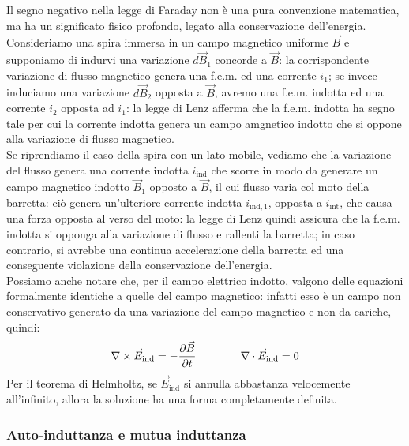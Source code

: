 \documentclass[]{article}
\begin{document}
Il segno negativo nella legge di Faraday non è una pura convenzione matematica, ma ha un significato fisico profondo, legato alla conservazione dell'energia. \\ 
%
Consideriamo una spira immersa in un campo magnetico uniforme $ \vec{B} $ e supponiamo di indurvi una variazione $ d\vec{B}_1 $ concorde a $ \vec{B} $: la corrispondente variazione di flusso magnetico genera una f.e.m. ed una corrente $ i_1 $; se invece induciamo una variazione $ d\vec{B}_2 $ opposta a $ \vec{B} $, avremo una f.e.m. indotta ed una corrente $ i_2 $ opposta ad $ i_1 $: la legge di Lenz afferma che la f.e.m. indotta ha segno tale per cui la corrente indotta genera un campo amgnetico indotto che si oppone alla variazione di flusso magnetico. \\ 
%
Se riprendiamo il caso della spira con un lato mobile, vediamo che la variazione del flusso genera una corrente indotta $ i_{\text{ind}} $ che scorre in modo da generare un campo magnetico indotto $ \vec{B}_1 $ opposto a $ \vec{B} $, il cui flusso varia col moto della barretta: ciò genera un'ulteriore corrente indotta $ i_{\text{ind},1} $, opposta a $ i_{\text{int}} $, che causa una forza opposta al verso del moto: la legge di Lenz quindi assicura che la f.e.m. indotta si opponga alla variazione di flusso e rallenti la barretta; in caso contrario, si avrebbe una continua accelerazione della barretta ed una conseguente violazione della conservazione dell'energia. \\ 
%
Possiamo anche notare che, per il campo elettrico indotto, valgono delle equazioni formalmente identiche a quelle del campo magnetico: infatti esso è un campo non conservativo generato da una variazione del campo magnetico e non da cariche, quindi:
\begin{equation}
	\nabla\times\vec{E}_{\text{ind}} = -\frac{\partial\vec{B}}{\partial t} \qquad\qquad \nabla\cdot\vec{E}_{\text{ind}} = 0
	\label{eq:16}
\end{equation}
Per il teorema di Helmholtz, se $ \vec{E}_{\text{ind}} $ si annulla abbastanza velocemente all'infinito, allora la soluzione ha una forma completamente definita.

\subsubsection{Auto-induttanza e mutua induttanza}
\end{document}
